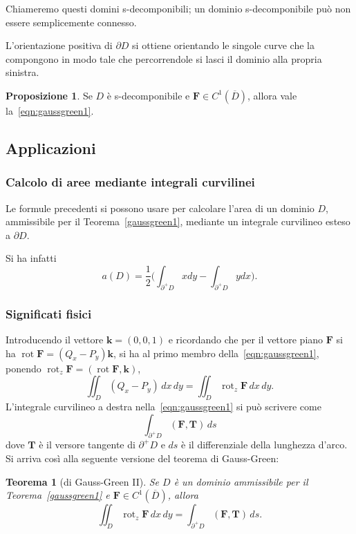 \documentclass[a4paper]{book}
\DeclareMathOperator{\rot}{rot}
\numberwithin{equation}{section}
\theoremstyle{plain}
\newtheorem{teor}{Teorema}[section]
\theoremstyle{definition}
\newtheorem{prop}{Proposizione}[section]
\theoremstyle{remark}
\renewcommand{\vec}{\boldsymbol}
\theoremstyle{example}
\begin{document}
Chiameremo questi domini s-decomponibili; un dominio s-decomponibile può non essere semplicemente connesso.

L'orientazione positiva di $\partial D$ si ottiene orientando le singole curve che la compongono in modo tale che percorrendole si lasci il dominio alla propria sinistra.

\begin{prop}
Se $D$ è s-decomponibile e $\vec{F} \in C^1(\overline{D})$, allora vale la~\eqref{eqn:gaussgreen1}.
\end{prop}

\subsection{Applicazioni}

\subsubsection*{Calcolo di aree mediante integrali curvilinei}
Le formule precedenti si possono usare per calcolare l'area di un dominio $D$, ammissibile per il Teorema~\ref{gaussgreen1}, mediante un integrale curvilineo esteso a $\partial D$.

Si ha infatti
	\begin{equation}
		a(D) = \frac{1}{2} \biggl( \int_{\partial^+D}x dy - \int_{\partial^+D}y dx \biggr).
	\end{equation}

	\subsubsection*{Significati fisici}
	Introducendo il vettore $\vec{k} = (0, 0, 1)$ e ricordando che per il vettore piano $\vec{F}$ si ha $\rot \vec{F} = (Q_x - P_y) \vec{k}$, si ha al primo membro della~\eqref{eqn:gaussgreen1}, ponendo $\rot_z \vec{F} = (\rot \vec{F}, \vec{k})$,
		\begin{equation}
			\iint_D (Q_x - P_y)\,dx \,dy = \iint_D \rot_z \vec{F} \,dx \, dy.
		\end{equation}
L'integrale curvilineo a destra nella~\eqref{eqn:gaussgreen1} si può scrivere come
	\begin{equation*}
		\int_{\partial^+D} (\vec{F}, \vec{T}) \, ds
	\end{equation*}
dove $\vec{T}$ è il versore tangente di $\partial^+ D$ e $ds$ è il differenziale della lunghezza d'arco. Si arriva così alla seguente versione del teorema di Gauss-Green:
	\begin{teor}[di Gauss-Green II]
		Se $D$ è un dominio ammissibile per il Teorema~\ref{gaussgreen1} e $\vec{F} \in C^1(\overline{D})$, allora
			\begin{equation}
				\label{eqn:stokespiano}
				\iint_D \rot_z \vec{F} \, dx \, dy = \int_{\partial^+D} (\vec{F}, \vec{T}) \, ds.
			\end{equation}
	\end{teor}
\end{document}
